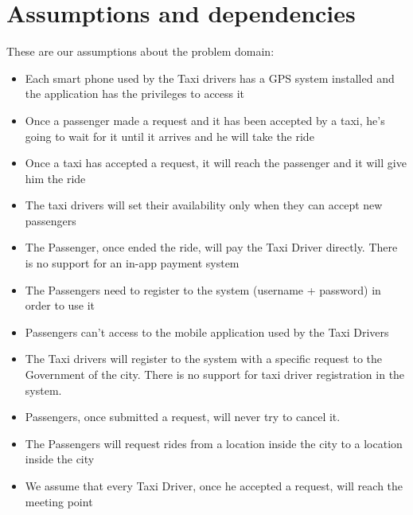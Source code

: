 \section{Assumptions and dependencies}
These are our assumptions about the problem domain:
\begin{itemize}
\item Each smart phone used by the Taxi drivers has a GPS system installed and the application has the privileges to access  it
\item Once a passenger made a request and it has been accepted by a taxi, he's going to wait for it until it arrives and he will take the ride
\item Once a taxi has accepted a request, it will reach the passenger and it will give him the ride
\item The taxi drivers will set their availability only when they can accept new passengers
\item The Passenger, once ended the ride, will pay the Taxi Driver directly. There is no support for an in-app payment system
\item The Passengers need to register to the system (username + password) in order to use it
\item Passengers can't access to the mobile application used by the Taxi Drivers
\item The Taxi drivers will register to the system with a specific request to the Government of the city. There is no support for taxi driver registration in the system.
\item Passengers, once submitted a request, will never try to cancel it.
\item The Passengers will request rides from a location inside the city to a location inside the city

\item We assume that every Taxi Driver, once he accepted a request, will reach the meeting point
\end{itemize}

